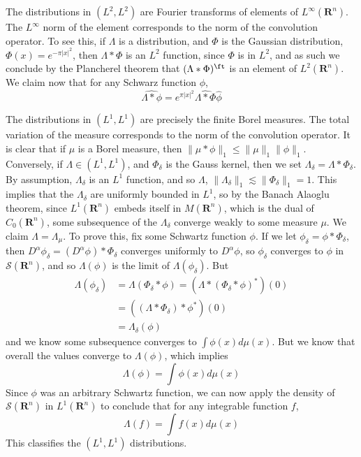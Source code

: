 \begin{example}
	The distributions in $(L^2, L^2)$ are Fourier transforms of elements of $L^\infty(\mathbf{R}^n)$. The $L^\infty$ norm of the element corresponds to the norm of the convolution operator. To see this, if $\Lambda$ is a distribution, and $\Phi$ is the Gaussian distribution, $\Phi(x) = e^{-\pi|x|^2}$, then $\Lambda * \Phi$ is an $L^2$ function, since $\Phi$ is in $L^2$, and as such we conclude by the Plancherel theorem that $(\Lambda * \Phi)^\ft$ is an element of $L^2(\mathbf{R}^n)$. We claim now that for any Schwarz function $\phi$,
	\[ \widehat{\Lambda * \phi} = e^{\pi |x|^2} \widehat{\Lambda * \Phi} \widehat{\phi} \]
\end{example}

\begin{example}
	The distributions in $(L^1, L^1)$ are precisely the finite Borel measures. The total variation of the measure corresponds to the norm of the convolution operator. It is clear that if $\mu$ is a Borel measure, then $\| \mu * \phi \|_1 \leq \| \mu \|_1 \| \phi \|_1$. Conversely, if $\Lambda \in (L^1, L^1)$, and $\Phi_\delta$ is the Gauss kernel, then we set $\Lambda_\delta = \Lambda * \Phi_\delta$. By assumption, $\Lambda_\delta$ is an $L^1$ function, and so $\Lambda$, $\| \Lambda_\delta \|_1 \lesssim \| \Phi_\delta \|_1 = 1$. This implies that the $\Lambda_\delta$ are uniformly bounded in $L^1$, so by the Banach Alaoglu theorem, since $L^1(\mathbf{R}^n)$ embeds itself in $M(\mathbf{R}^n)$, which is the dual of $C_0(\mathbf{R}^n)$, some subsequence of the $\Lambda_\delta$ converge weakly to some measure $\mu$. We claim $\Lambda = \Lambda_\mu$. To prove this, fix some Schwartz function $\phi$. If we let $\phi_\delta = \phi * \Phi_\delta$, then $D^\alpha \phi_\delta = (D^\alpha \phi) * \Phi_\delta$ converges uniformly to $D^\alpha \phi$, so $\phi_\delta$ converges to $\phi$ in $\mathcal{S}(\mathbf{R}^n)$, and so $\Lambda(\phi)$ is the limit of $\Lambda(\phi_\delta)$. But
	\begin{align*}
		\Lambda(\phi_\delta) &= \Lambda(\Phi_\delta * \phi) = (\Lambda * (\Phi_\delta * \phi)^*)(0)\\
		&= ((\Lambda * \Phi_\delta) * \phi^*)(0)\\
		&= \Lambda_\delta(\phi)
	\end{align*}
	and we know some subsequence converges to $\int \phi(x) d\mu(x)$. But we know that overall the values converge to $\Lambda(\phi)$, which implies
	\[ \Lambda(\phi) = \int \phi(x) d\mu(x) \]
	Since $\phi$ was an arbitrary Schwartz function, we can now apply the density of $\mathcal{S}(\mathbf{R}^n)$ in $L^1(\mathbf{R}^n)$ to conclude that for any integrable function $f$,
	\[ \Lambda(f) = \int f(x) d\mu(x) \]
	This classifies the $(L^1, L^1)$ distributions.
\end{example}

